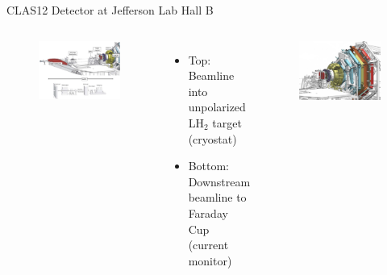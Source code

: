 \documentclass[aspectratio=169]{beamer}
\begin{document}
\begin{frame}{CLAS12 Detector at Jefferson Lab Hall B} \label{frame:datasets2}
        \vspace{-0.5cm}
        \begin{columns}[t, onlytextwidth]
                \begin{figure}[t!]
                    \includegraphics[width=.86349\textwidth]{Main/beamline.png}
                    
                    
                \end{figure}
                \vspace{-0.45cm}
                  \begin{itemize}
                    \setlength\itemsep{1em}
                    \item  Top: Beamline into unpolarized LH$_2$ target (cryostat)
                    \item Bottom: Downstream beamline to Faraday Cup (current monitor)
                    \end{itemize}
                    
                \begin{figure}[t!]
                    \includegraphics[width=.8565899\textwidth]{DNP/CLASdetector.jpg}
                    

\end{figure}
\end{columns}
\end{frame}
\end{document}

